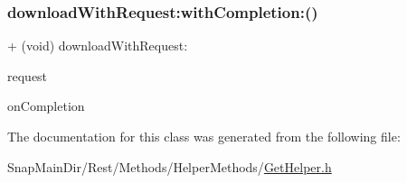 \subsubsection{\texorpdfstring{download\+With\+Request\+:with\+Completion\+:()}{downloadWithRequest:withCompletion:()}}
{\footnotesize\ttfamily + (void) download\+With\+Request\+: \begin{DoxyParamCaption}\item[{(N\+S\+U\+RL $\ast$)}]{request }\item[{withCompletion:(void($^\wedge$)(B\+O\+OL, id))}]{on\+Completion }\end{DoxyParamCaption}}



The documentation for this class was generated from the following file\+:\begin{DoxyCompactItemize}
\item 
Snap\+Main\+Dir/\+Rest/\+Methods/\+Helper\+Methods/\hyperlink{_get_helper_8h}{Get\+Helper.\+h}\end{DoxyCompactItemize}
